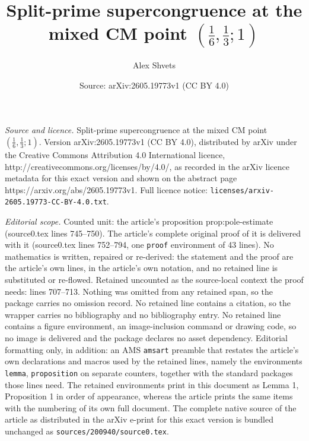 \documentclass[10pt,a4paper]{amsart}
\title{Split-prime supercongruence at the mixed CM point $(\tfrac16,\tfrac13;1)$}
\author{Alex Shvets}
\date{Source: arXiv:2605.19773v1 (CC BY 4.0)}
\begin{document}
\maketitle

\noindent\emph{Source and licence.} Split-prime supercongruence at the mixed CM point $(\tfrac16,\tfrac13;1)$. Version arXiv:2605.19773v1 (CC BY 4.0), distributed by arXiv under the Creative Commons Attribution 4.0 International licence, http://creativecommons.org/licenses/by/4.0/, as recorded in the arXiv licence metadata for this exact version and shown on the abstract page https://arxiv.org/abs/2605.19773v1. Full licence notice: \texttt{licenses/arxiv-2605.19773-CC-BY-4.0.txt}.\par\smallskip

\noindent\textit{Editorial scope.} Counted unit: the article's proposition prop:pole-estimate (source0.tex lines 745--750). The article's complete original proof of it is delivered with it (source0.tex lines 752--794, one \texttt{proof} environment of 43 lines). No mathematics is written, repaired or re-derived: the statement and the proof are the article's own lines, in the article's own notation, and no retained line is substituted or re-flowed.  Retained uncounted as the source-local context the proof needs: lines 707--713.  Nothing was omitted from any retained span, so the package carries no omission record.  No retained line contains a citation, so the wrapper carries no bibliography and no bibliography entry.  No retained line contains a figure environment, an image-inclusion command or drawing code, so no image is delivered and the package declares no asset dependency.  Editorial formatting only, in addition: an AMS \texttt{amsart} preamble that restates the article's own declarations and macros used by the retained lines, namely the environments \texttt{lemma}, \texttt{proposition} on separate counters, together with the standard packages those lines need.  The retained environments print in this document as Lemma 1, Proposition 1 in order of appearance, whereas the article prints the same items with the numbering of its own full document.  The complete native source of the article as distributed in the arXiv e-print for this exact version is bundled unchanged as \texttt{sources/200940/source0.tex}.
\end{document}
